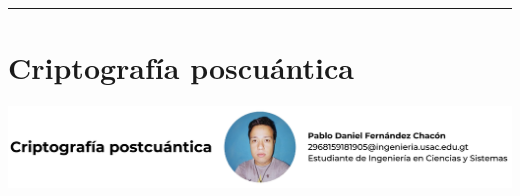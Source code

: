 \documentclass[12pt,spanish,Letterpaper,openany]{book}
\newcommand{\HRule}{\begin{center}\rule{0.5\linewidth}{0.2mm}\end{center}}
\begin{document}
\medskip

\HRule

\medskip

\hypertarget{art10}{%
\chapter{Criptografía poscuántica}\label{art10}}

\begin{center}\includegraphics[width=1\linewidth]{autores/art10} \end{center}
\end{document}
